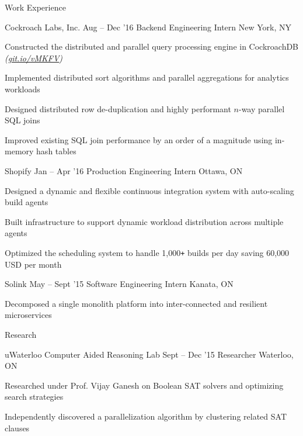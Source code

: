 \documentclass{resume} %
\begin{document}
\begin{rSection}{Work Experience}
  \begin{rSubsection}{Cockroach Labs, Inc.}
                     {Aug -- Dec '16}
                     {Backend Engineering Intern}
                     {New York, NY}

    \item Constructed the distributed and parallel query processing engine in
      CockroachDB {\em (\href{https://git.io/vMKFV}{git.io/vMKFV})}
    \item Implemented distributed sort algorithms and parallel aggregations for
      analytics workloads
    \item Designed distributed row de-duplication and highly performant $n$-way
      parallel SQL joins
    \item Improved existing SQL join performance by an order of a magnitude
      using in-memory hash tables
  \end{rSubsection}

  \begin{rSubsection}{Shopify}
                     {Jan -- Apr '16}
                     {Production Engineering Intern}
                     {Ottawa, ON}

  \item Designed a dynamic and flexible continuous integration system with
    auto-scaling build agents
  \item Built infrastructure to support dynamic workload distribution across
    multiple agents
  \item Optimized the scheduling system to handle 1,000\texttt{+} builds per
    day saving 60,000 USD per month
  \end{rSubsection}

  \begin{rSubsection}{Solink}
                     {May -- Sept '15}
                     {Software Engineering Intern}
                     {Kanata, ON}

    \item Decomposed a single monolith platform into inter-connected and resilient
      microservices
  \end{rSubsection}
\end{rSection}


\begin{rSection}{Research}
  \begin{rSubsection}{uWaterloo Computer Aided Reasoning Lab}
                     {Sept -- Dec '15}
                     {Researcher}
                     {Waterloo, ON}
    \item Researched under Prof. Vijay Ganesh on Boolean SAT solvers and optimizing
      search strategies
    \item Independently discovered a parallelization algorithm by clustering
      related SAT clauses
  \end{rSubsection}
\end{rSection}
\end{document}
